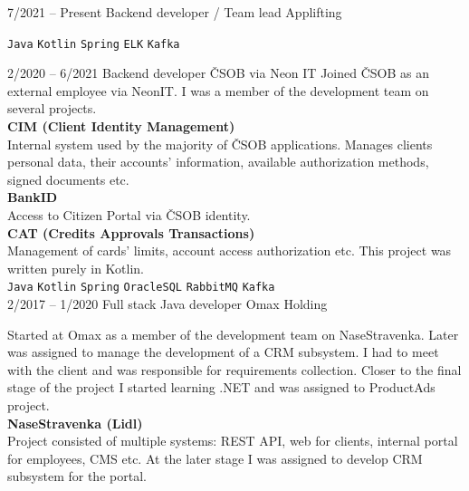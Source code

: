 \documentclass[9pt]{developercv} %
\begin{document}
\begin{entrylist}
    \entry
    {7/2021 -- Present}
    {Backend developer / Team lead}
    {Applifting}
    {

    \texttt{Java}\slashsep
    \texttt{Kotlin}\slashsep
    \texttt{Spring}\slashsep
    \texttt{ELK}\slashsep
    \texttt{Kafka}\\
    }
    \entry
    {2/2020 -- 6/2021}
    {Backend developer}
    {ČSOB via Neon IT}
    {
        Joined ČSOB as an external employee via NeonIT.
        I was a member of the development team on several projects.\\

        \textbf{CIM (Client Identity Management)}\\
        Internal system used by the majority of ČSOB applications.
        Manages clients personal data, their accounts' information, available authorization methods, signed documents etc.\\

        \textbf{BankID}\\
        Access to Citizen Portal via ČSOB identity.\\

        \textbf{CAT (Credits Approvals Transactions)}\\
        Management of cards' limits, account access authorization etc.
        This project was written purely in Kotlin.\\

        \texttt{Java}\slashsep
        \texttt{Kotlin}\slashsep
        \texttt{Spring}\slashsep
        \texttt{OracleSQL}\slashsep
        \texttt{RabbitMQ}\slashsep
        \texttt{Kafka}\\
    }
    \entry
    {2/2017 -- 1/2020}
    {Full stack Java developer}
    {Omax Holding}
    {
        Started at Omax as a member of the development team on NaseStravenka.
        Later was assigned to manage the development of a CRM subsystem.
        I had to meet with the client and was responsible for requirements collection.
        Closer to the final stage of the project I started learning .NET and was assigned to ProductAds project.\\

        \textbf{NaseStravenka (Lidl)}\\
        Project consisted of multiple systems: REST API, web for clients, internal portal for employees, CMS etc.
        At the later stage I was assigned to develop CRM subsystem for the portal.

}
\end{entrylist}
\end{document}
